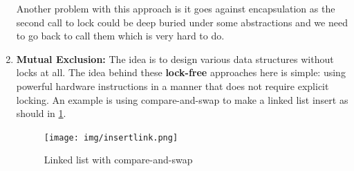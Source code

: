 \begin{enumerate}
        Another problem with this approach is it goes against encapsulation as
        the second call to lock could be deep buried under some abstractions 
        and we need to go back to call them which is very hard to do.

    \item \textbf{Mutual Exclusion:} The idea is to design various data 
        structures without locks at all. The idea behind these \textbf{lock-free}
        approaches here is simple: using powerful hardware instructions
        in a manner that does not require explicit locking. An example is using
        compare-and-swap to make a linked list insert as should in \ref{insertlink}.

        \begin{figure}[h!]
            \label{insertlink}
            \begin{center}
                \texttt{[image: img/insertlink.png]}
                \caption{Linked list with compare-and-swap}
            \end{center}
        \end{figure}
\end{enumerate}
